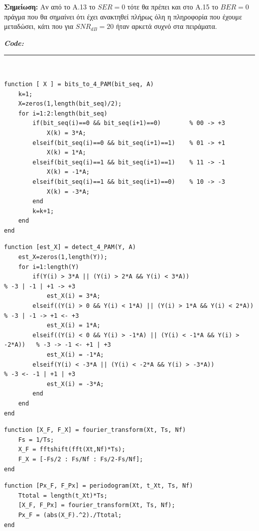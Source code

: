 \documentclass[11pt]{article}
\begin{document}
    \par \noindent
    \textbf{Σημείωση:} Αν από το Α.13 το $SER=0$ τότε θα πρέπει και στο Α.15 το $BER=0$ πράγμα που θα σημαίνει ότι έχει ανακτηθεί πλήρως όλη η πληροφορία που έχουμε μεταδώσει, κάτι που για $SNR_{dB}=20$ ήταν αρκετά συχνό στα πειράματα.
    
%
%
%
\newpage

\textbf{\emph{Code:}} \\
\rule{\linewidth}{0.3mm} \\[0.1cm]

    \begin{lstlisting}[caption = {\texttt{bits\_to\_4\_PAM.m}}]
function [ X ] = bits_to_4_PAM(bit_seq, A)
    k=1;
    X=zeros(1,length(bit_seq)/2);
    for i=1:2:length(bit_seq)
        if(bit_seq(i)==0 && bit_seq(i+1)==0)        % 00 -> +3
            X(k) = 3*A;
        elseif(bit_seq(i)==0 && bit_seq(i+1)==1)    % 01 -> +1
            X(k) = 1*A;
        elseif(bit_seq(i)==1 && bit_seq(i+1)==1)    % 11 -> -1
            X(k) = -1*A;
        elseif(bit_seq(i)==1 && bit_seq(i+1)==0)    % 10 -> -3
            X(k) = -3*A;
        end
        k=k+1;
    end
end
    \end{lstlisting}
    \begin{lstlisting}[caption = {\texttt{detect\_4\_PAM.m}}]
function [est_X] = detect_4_PAM(Y, A)
    est_X=zeros(1,length(Y));
    for i=1:length(Y)
        if(Y(i) > 3*A || (Y(i) > 2*A && Y(i) < 3*A))                        % -3 | -1 | +1 -> +3
            est_X(i) = 3*A;
        elseif((Y(i) > 0 && Y(i) < 1*A) || (Y(i) > 1*A && Y(i) < 2*A))      % -3 | -1 -> +1 <- +3
            est_X(i) = 1*A;
        elseif((Y(i) < 0 && Y(i) > -1*A) || (Y(i) < -1*A && Y(i) > -2*A))   % -3 -> -1 <- +1 | +3
            est_X(i) = -1*A;
        elseif(Y(i) < -3*A || (Y(i) < -2*A && Y(i) > -3*A))                 % -3 <- -1 | +1 | +3
            est_X(i) = -3*A;
        end
    end
end
    \end{lstlisting}
     \begin{lstlisting}[caption = {\texttt{fourier\_transform.m}}]
function [X_F, F_X] = fourier_transform(Xt, Ts, Nf)
    Fs = 1/Ts;
    X_F = fftshift(fft(Xt,Nf)*Ts);
    F_X = [-Fs/2 : Fs/Nf : Fs/2-Fs/Nf];
end
    \end{lstlisting}
    \begin{lstlisting}[caption = {\texttt{periodogram.m}}]
function [Px_F, F_Px] = periodogram(Xt, t_Xt, Ts, Nf)
    Ttotal = length(t_Xt)*Ts;
    [X_F, F_Px] = fourier_transform(Xt, Ts, Nf);
    Px_F = (abs(X_F).^2)./Ttotal;
end
    \end{lstlisting}
    
\end{document}
